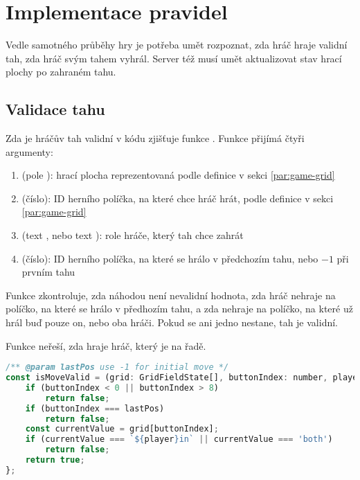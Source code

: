 \section{Implementace pravidel}\label{sec:rules-implementation}

Vedle samotného průběhy hry je potřeba umět rozpoznat, zda hráč hraje validní
tah, zda hráč svým tahem vyhrál. Server též musí umět aktualizovat stav hrací
plochy po zahraném tahu.

\subsection{Validace tahu}
Zda je hráčův tah validní v kódu zjišťuje funkce . Funkce
přijímá čtyři argumenty:
\begin{enumerate}
    \item {} (pole ): hrací plocha reprezentovaná podle
        definice v sekci \ref{par:game-grid}
    \item {} (číslo): ID herního políčka, na které chce hráč hrát,
        podle definice v sekci \ref{par:game-grid}
    \item {} (text , nebo text ): role hráče,
        který tah chce zahrát
    \item {} (číslo): ID herního políčka, na které se hrálo v
        předchozím tahu, nebo $-1$ při prvním tahu
\end{enumerate}

Funkce zkontroluje, zda  náhodou není nevalidní hodnota, zda
hráč nehraje na políčko, na které se hrálo v předhozím tahu, a zda nehraje na
políčko, na které už hrál buď pouze on, nebo oba hráči. Pokud se ani jedno
nestane, tah je validní.

Funkce neřeší, zda hraje hráč, který je na řadě.

\begin{lstlisting}[language=JavaScript,caption={Funkce \M{isMoveValid}},label={lst:is-move-valid}]
/** @param lastPos use -1 for initial move */
const isMoveValid = (grid: GridFieldState[], buttonIndex: number, player: 'player1' | 'player2', lastPos: number) => {
    if (buttonIndex < 0 || buttonIndex > 8)
        return false;
    if (buttonIndex === lastPos)
        return false;
    const currentValue = grid[buttonIndex];
    if (currentValue === `${player}in` || currentValue === 'both')
        return false;
    return true;
};
\end{lstlisting}

